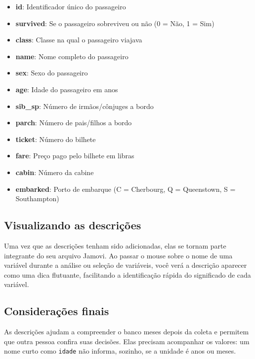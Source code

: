 \begin{itemize}
    \item \textbf{id}: Identificador único do passageiro
    \item \textbf{survived}: Se o passageiro sobreviveu ou não (0 = Não, 1 = Sim)
    \item \textbf{class}: Classe na qual o passageiro viajava
    \item \textbf{name}: Nome completo do passageiro
    \item \textbf{sex}: Sexo do passageiro
    \item \textbf{age}: Idade do passageiro em anos
    \item \textbf{sib\_sp}: Número de irmãos/cônjuges a bordo
    \item \textbf{parch}: Número de pais/filhos a bordo
    \item \textbf{ticket}: Número do bilhete
    \item \textbf{fare}: Preço pago pelo bilhete em libras
    \item \textbf{cabin}: Número da cabine
    \item \textbf{embarked}: Porto de embarque (C = Cherbourg, Q = Queenstown, S = Southampton)
\end{itemize}


\subsection{Visualizando as descrições}

Uma vez que as descrições tenham sido adicionadas, elas se tornam parte integrante do seu arquivo Jamovi. Ao passar o mouse sobre o nome de uma variável durante a análise ou seleção de variáveis, você verá a descrição aparecer como uma dica flutuante, facilitando a identificação rápida do significado de cada variável.

\subsection{Considerações finais}

As descrições ajudam a compreender o banco meses depois da coleta e permitem que outra pessoa confira suas decisões. Elas precisam acompanhar os valores: um nome curto como \texttt{idade} não informa, sozinho, se a unidade é anos ou meses.

